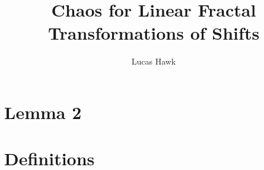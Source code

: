 \documentclass{article}
\title{Chaos for Linear Fractal Transformations of Shifts}
\author{Lucas Hawk}
\theoremstyle{plain}
\theoremstyle{definition}
\begin{document}
\maketitle
\section{Lemma 2}


\section{Definitions}

\end{document}
